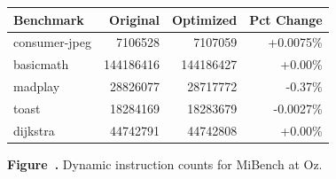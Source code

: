 \par\vspace{1.2em}

\begin{center}
{\normalfont\normalsize
\setlength{\tabcolsep}{5pt}
\renewcommand{\arraystretch}{1.08}
\begin{tabular}{@{}lrrr@{}}
\toprule
Benchmark & Original & Optimized & Pct Change \\
\midrule
consumer-jpeg & 7106528   & 7107059   & +0.0075\% \\
basicmath     & 144186416 & 144186427 & +0.00\% \\
madplay       & 28826077  & 28717772  & -0.37\% \\
toast         & 18284169  & 18283679  & -0.0027\% \\
dijkstra      & 44742791  & 44742808  & +0.00\% \\
\bottomrule
\end{tabular}
}
\end{center}

\vspace{0.12em}

\label{fig:figure16}

\begin{center}
\small\textbf{Figure~\thefigure.} Dynamic instruction counts for MiBench at Oz.
\end{center}

\par\vspace{1.2em}
